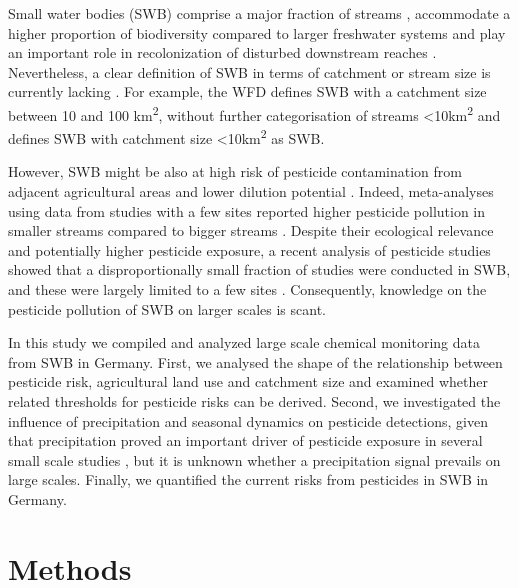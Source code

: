 \documentclass[journal=esthag,manuscript=article]{achemso}
\begin{document}
Small water bodies (SWB) comprise a major fraction of streams \citep{nadeau_hydrological_2007}, accommodate a higher proportion of biodiversity compared to larger freshwater systems \citep{davies_comparison_2008, biggs_report_2014} and play an important role in recolonization of disturbed downstream reaches \citep{liess_analyzing_2005, orlinskiy_forested_2015}.
Nevertheless, a clear definition of SWB in terms of catchment or stream size is currently lacking \citep{lorenz_specifics_2016}. 
For example, the WFD defines SWB with a catchment size between 10 and 100 km\textsuperscript{2}, without further categorisation of streams \textless 10km\textsuperscript{2} and \citet{lorenz_specifics_2016} defines SWB with catchment size \textless 10km\textsuperscript{2} as SWB. 

However, SWB might be also at high risk of pesticide contamination from adjacent agricultural areas and lower dilution potential \citep{schulz_field_2004,liess_determination_1999}.
Indeed, meta-analyses using data from studies with a few sites reported higher pesticide pollution in smaller streams compared to bigger streams \citep{stehle_pesticide_2015,schulz_field_2004}.
Despite their ecological relevance and potentially higher pesticide exposure, a recent analysis of pesticide studies showed that a disproportionally small fraction of studies were conducted in SWB, and these were largely limited to a few sites \citep{lorenz_specifics_2016}. 
Consequently, knowledge on the pesticide pollution of SWB on larger scales is scant.

In this study we compiled and analyzed large scale chemical monitoring data from SWB in Germany. 
First, we analysed the shape of the relationship between pesticide risk, agricultural land use and catchment size and examined whether related thresholds for pesticide risks can be derived. 
Second, we investigated the influence of precipitation and seasonal dynamics on pesticide detections, given that precipitation proved an important driver of pesticide exposure in several small scale studies \citep{wittmer_significance_2010}\citep{schulz_field_2004}, but it is unknown whether a precipitation signal prevails on large scales. 
Finally, we quantified the current risks from pesticides in SWB in Germany.



\section{Methods}
\end{document}
